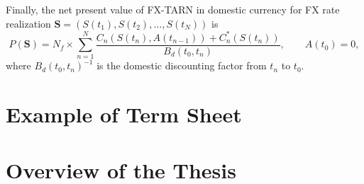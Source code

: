 Finally, the net present value of FX-TARN in domestic currency for FX rate realization $\mathbf{S} = (S(t_1),S(t_2),\ldots,S(t_N))$ is
\begin{equation}\label{eq:intro:pv}
P(\mathbf{S}) =N_f \times \sum_{n=1}^N\frac{C_n(S(t_n),A(t_{n-1}))+C^\ast_n(S(t_n))}{B_d(t_0,t_n)}, \qquad A(t_0)=0,
\end{equation}
where $B_d(t_0,t_n)^{-1}$ is the domestic discounting factor from $t_n$ to $t_0$.

\section{Example of Term Sheet}
\label{sec:intro:term_sheet}

\section{Overview of the Thesis}
\label{sec:intro:overview}
